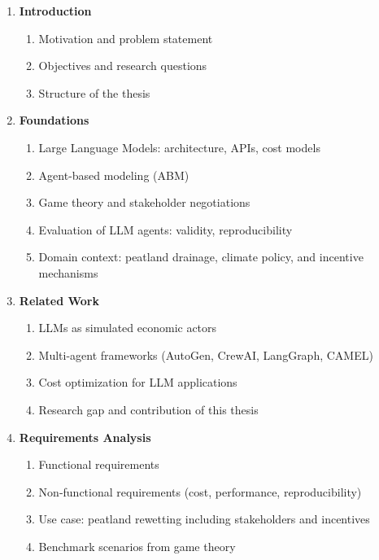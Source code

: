 \documentclass[12pt, a4paper]{article}
\begin{document}
\begin{enumerate}
    \item \textbf{Introduction}
    \begin{enumerate}[label=\arabic{enumi}.\arabic*]
        \item Motivation and problem statement
        \item Objectives and research questions
        \item Structure of the thesis
    \end{enumerate}

    \item \textbf{Foundations}
    \begin{enumerate}[label=\arabic{enumi}.\arabic*]
        \item Large Language Models: architecture, APIs, cost models
        \item Agent-based modeling (ABM)
        \item Game theory and stakeholder negotiations
        \item Evaluation of LLM agents: validity, reproducibility
        \item Domain context: peatland drainage, climate policy, and incentive mechanisms
    \end{enumerate}

    \item \textbf{Related Work}
    \begin{enumerate}[label=\arabic{enumi}.\arabic*]
        \item LLMs as simulated economic actors
        \item Multi-agent frameworks (AutoGen, CrewAI, LangGraph, CAMEL)
        \item Cost optimization for LLM applications
        \item Research gap and contribution of this thesis
    \end{enumerate}

    \item \textbf{Requirements Analysis}
    \begin{enumerate}[label=\arabic{enumi}.\arabic*]
        \item Functional requirements
        \item Non-functional requirements (cost, performance, reproducibility)
        \item Use case: peatland rewetting including stakeholders and incentives
        \item Benchmark scenarios from game theory
    \end{enumerate}


\end{enumerate}
\end{document}
